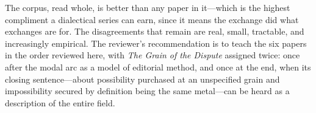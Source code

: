 \documentclass[11pt]{article}
\newcommand{\GD}{\emph{The Grain of the Dispute}}
\begin{document}
\vspace{0.8em}
\noindent The corpus, read whole, is better than any paper in it---which is the highest compliment a dialectical series can earn, since it means the exchange did what exchanges are for. The disagreements that remain are real, small, tractable, and increasingly empirical. The reviewer's recommendation is to teach the six papers in the order reviewed here, with \GD{} assigned twice: once after the modal arc as a model of editorial method, and once at the end, when its closing sentence---about possibility purchased at an unspecified grain and impossibility secured by definition being the same metal---can be heard as a description of the entire field.
\end{document}
